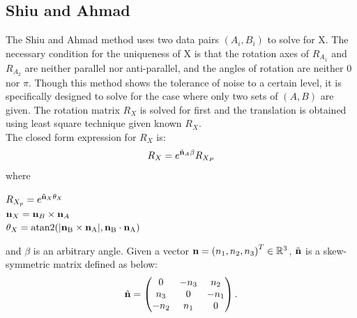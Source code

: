 \documentclass[twocolumn,10pt]{asme2ej}
\newcommand{\nn}{{\bf n}}
\newcommand{\ttt}{{\bf t}}
\begin{document}

\subsection{Shiu and Ahmad }
The Shiu and Ahmad method\cite{shiu1989calibration} uses two data pairs $(A_{i}, B_{i})$ to solve for X. The necessary condition for the uniqueness of X is that the rotation axes of $R_{A_1}$ and $R_{A_2}$ are neither parallel nor anti-parallel, and the angles of rotation are neither 0 nor $\pi$. Though this method shows the tolerance of noise to a certain level, it is specifically designed to solve for the case where only two sets of $(A, B)$ are given. 
The rotation matrix $R_{X}$ is solved for first and the translation is obtained using least square technique given known $R_{X}$.\\

The closed form expression for $R_{X}$ is:
\begin{equation}
R_{X} = e^{\tilde{\nn}_{A}\beta}R_{X_{P}}
\label{RotationCheng}
\end{equation}
where 
\begin{center}
$R_{X_{p}} =  e^{\tilde{\nn}_{X}\theta_{X}}$\\
$\nn_{X} = \nn_{B} \times \nn_{A}$\\
$\theta_{X} = \rm atan2(|\nn_{B} \times \nn_{A}|,\nn_{B} \cdot \nn_{A})$\\
\end{center}
and $\beta$ is an arbitrary angle. Given a vector $\nn = \left( n_{1}, n_{2}, n_{3} \right)^{T} \in \mathbb{R}^{3}$, $\tilde{\nn}$ is a skew-symmetric matrix defined as below:\\
\begin{equation}
\tilde{\nn}
=
\begin{pmatrix}
0 & -n_{3} & n_{2} \\
n_{3} & 0 & -n_{1} \\
-n_{2} & n_{1} & 0
\end{pmatrix}.
\end{equation}
\end{document}
